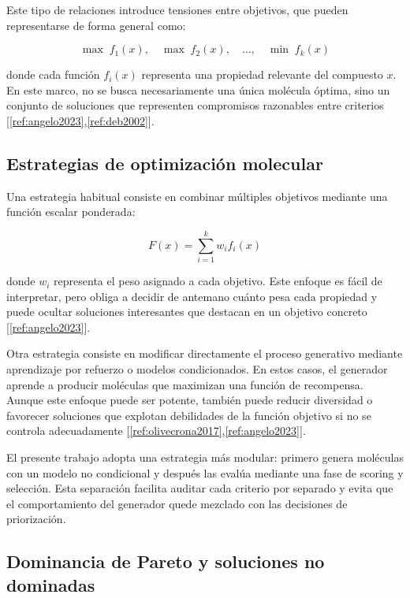 \documentclass[IB]{TFUOC}%
\begin{document}
Este tipo de relaciones introduce tensiones entre objetivos, que pueden representarse de forma general como:

\begin{equation}
\max \; f_1(x), \quad \max \; f_2(x), \quad \dots, \quad \min \; f_k(x)
\end{equation}

donde cada función $f_i(x)$ representa una propiedad relevante del compuesto $x$. En este marco, no se busca necesariamente una única molécula óptima, sino un conjunto de soluciones que representen compromisos razonables entre criterios [\ref{ref:angelo2023},\ref{ref:deb2002}].

\subsection{Estrategias de optimización molecular}

Una estrategia habitual consiste en combinar múltiples objetivos mediante una función escalar ponderada:

\begin{equation}
F(x) = \sum_{i=1}^{k} w_i f_i(x)
\end{equation}

donde $w_i$ representa el peso asignado a cada objetivo. Este enfoque es fácil de interpretar, pero obliga a decidir de antemano cuánto pesa cada propiedad y puede ocultar soluciones interesantes que destacan en un objetivo concreto [\ref{ref:angelo2023}].

Otra estrategia consiste en modificar directamente el proceso generativo mediante aprendizaje por refuerzo o modelos condicionados. En estos casos, el generador aprende a producir moléculas que maximizan una función de recompensa. Aunque este enfoque puede ser potente, también puede reducir diversidad o favorecer soluciones que explotan debilidades de la función objetivo si no se controla adecuadamente [\ref{ref:olivecrona2017},\ref{ref:angelo2023}].

El presente trabajo adopta una estrategia más modular: primero genera moléculas con un modelo no condicional y después las evalúa mediante una fase de scoring y selección. Esta separación facilita auditar cada criterio por separado y evita que el comportamiento del generador quede mezclado con las decisiones de priorización.

\subsection{Dominancia de Pareto y soluciones no dominadas}
\end{document}
